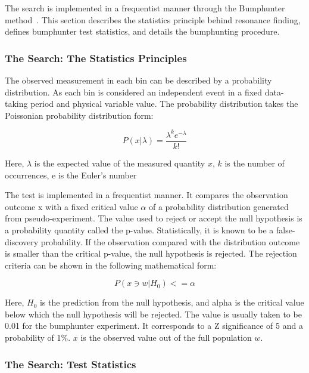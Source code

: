 The search is implemented in a frequentist manner through the Bumphunter method~\cite{choudalakis2011hypothesis}. This section describes the statistics principle behind resonance finding, defines bumphunter test statistics, and details the bumphunting procedure. 

\subsubsection{The Search: The Statistics Principles}
The observed measurement in each bin can be described by a probability distribution. As each bin is considered an independent event in a fixed data-taking period and physical variable value. The probability distribution takes the Poissonian probability distribution form:

\begin{equation}
 P(x|\lambda) = \frac{\lambda^{k}e^{-\lambda}}{k!} 
 \label{eq:Poissonian}
\end{equation}

Here, $\lambda$ is the expected value of the measured quantity $x$, $k$ is the number of occurrences, e is the Euler's number  

The test is implemented in a frequentist manner. It compares the observation outcome x with a fixed critical value $\alpha$ of a probability distribution generated from pseudo-experiment. 
The value used to reject or accept the null hypothesis is a probability quantity called the p-value. Statistically, it is known to be a false-discovery probability. 
    If the observation compared with the distribution outcome is smaller than the critical p-value, the null hypothesis is rejected. The rejection criteria can be shown in the following mathematical form:

\begin{equation}
    P(x \ni w|H_0)<= \alpha 
    \label{eq:test}
\end{equation}

Here, $H_0$ is the prediction from the null hypothesis, and alpha is the critical value below which the null hypothesis will be rejected. The value is usually taken to be 0.01 for the bumphunter experiment. It corresponds to a Z significance of 5 and a probability of 1\%. $x$ is the observed value out of the full population $w$.  

\subsubsection{The Search: Test Statistics}
\label{teststatistics}

